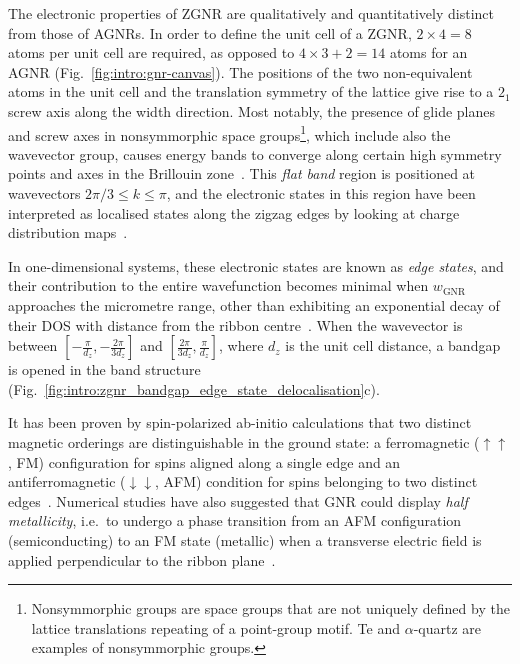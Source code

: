 %
The electronic properties of \gls{ZGNR} are qualitatively and quantitatively distinct from those of \glspl{AGNR}. In order to define the unit cell of a \gls{ZGNR}, $2\times4=8$ atoms per unit cell are required, as opposed to $4\times3+2=14$ atoms for an \gls{AGNR} (Fig.~\ref{fig:intro:gnr-canvas}). The positions of the two non-equivalent atoms in the unit cell and the translation symmetry of the lattice give rise to a $2_1$ screw axis along the width direction. Most notably, the presence of glide planes and screw axes in nonsymmorphic space groups\footnote[3]{Nonsymmorphic groups are space groups that are not uniquely defined by the lattice translations repeating of a point-group motif. Te and $\alpha$-quartz are examples of nonsymmorphic groups.}, which include also the wavevector group, causes energy bands to converge along certain high symmetry points and axes in the Brillouin zone~\cite{dresselhaus2007group}. This \textit{flat band} region is positioned at wavevectors $2\pi/3 \le k \le \pi$, and the electronic states in this region have been interpreted as localised states along the zigzag edges by looking at charge distribution maps~\cite{wakabayashi2010electronic}.

In one-dimensional systems, these electronic states are known as \textit{edge states}, and their contribution to the entire wavefunction becomes minimal when $w_\textrm{GNR}$ approaches the micrometre range, other than exhibiting an exponential decay of their \gls{DOS} with distance from the ribbon centre~\cite{kobayashi2006edge,son2006energy}. When the wavevector is between $\left[-\frac{\pi}{d_z}, -\frac{2\pi}{3d_z}\right]$ and $\left[\frac{2\pi}{3d_z}, \frac{\pi}{d_z}\right]$, where $d_z$ is the unit cell distance, a bandgap is opened in the band structure (Fig.~\ref{fig:intro:zgnr_bandgap_edge_state_delocalisation}c).

It has been proven by spin-polarized ab-initio calculations that two distinct magnetic orderings are distinguishable in the ground state: a ferromagnetic ($\uparrow\uparrow$, FM) configuration for spins aligned along a single edge and an antiferromagnetic ($\downarrow\downarrow$, AFM) condition for spins belonging to two distinct edges~\cite{son2006half}. Numerical studies have also suggested that \gls{GNR} could display \textit{half metallicity}, i.e.\ to undergo a phase transition from an AFM configuration (semiconducting) to an FM state (metallic) when a transverse electric field is applied perpendicular to the ribbon plane~\cite{son2006half, dutta2009intrinsic}.

